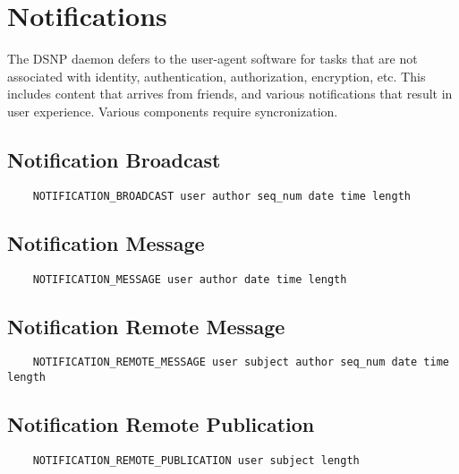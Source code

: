 \documentclass[letterpaper,11pt,oneside]{article}
\begin{document}
\section{Notifications}

The DSNP daemon defers to the user-agent software for tasks that are not
associated with identity, authentication, authorization, encryption, etc. This
includes content that arrives from friends, and various notifications that
result in user experience. Various components require syncronization.

\subsection{Notification Broadcast}

\vspace{10pt}
\begin{verbatim}
    NOTIFICATION_BROADCAST user author seq_num date time length 
\end{verbatim}
\vspace{10pt}

\subsection{Notification Message}

\vspace{10pt}
\begin{verbatim}
    NOTIFICATION_MESSAGE user author date time length 
\end{verbatim}
\vspace{10pt}

\subsection{Notification Remote Message}

\vspace{10pt}
\begin{verbatim}
    NOTIFICATION_REMOTE_MESSAGE user subject author seq_num date time length 
\end{verbatim}
\vspace{10pt}

\subsection{Notification Remote Publication}

\vspace{10pt}
\begin{verbatim}
    NOTIFICATION_REMOTE_PUBLICATION user subject length 
\end{verbatim}
\vspace{10pt}
\end{document}
